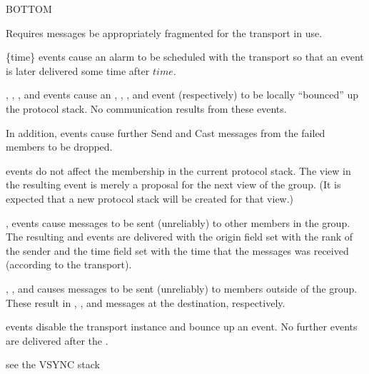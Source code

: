\begin{Layer}{BOTTOM}
\begin{Properties}
\item
Requires messages be appropriately fragmented for the transport in use.
\item
{}\{time\} events cause an alarm to be scheduled with the transport so
that an  event is later delivered some time after $time$.
\item
{}, , , and  events cause an ,
, , and  event (respectively) to be locally
``bounced'' up the protocol stack.  No communication results from these
events.
\item
In addition,  events cause further Send and Cast messages from the
failed members to be dropped.
\item
{} events do not affect the membership in the current protocol stack.
The view in the resulting  event is merely a proposal for the next
view of the group.  (It is expected that a new protocol stack will be
created for that view.)
\item
{},  events cause messages to be sent (unreliably) to other
members in the group.  The resulting  and  events are delivered
with the origin field set with the rank of the sender and the time field
set with the time that the messages was received (according to the
transport).
\item
{}, , and  causes messages to be sent
(unreliably) to members outside of the group.  These result in
, , and  messages at the
destination, respectively.
\item
{} events disable the transport instance and bounce up an 
event.  No further events are delivered after the . 
\end{Properties}

\begin{Sources}
\end{Sources}

\begin{GenEvent}
\end{GenEvent}

\begin{Testing}
\item see the VSYNC stack
\end{Testing}
\end{Layer}
